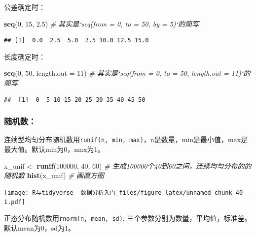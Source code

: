 \documentclass[]{book}
\newenvironment{Shaded}{\begin{snugshade}}{\end{snugshade}}
\newcommand{\CommentTok}[1]{\textcolor[rgb]{0.56,0.35,0.01}{\textit{#1}}}
\newcommand{\DataTypeTok}[1]{\textcolor[rgb]{0.13,0.29,0.53}{#1}}
\newcommand{\DecValTok}[1]{\textcolor[rgb]{0.00,0.00,0.81}{#1}}
\newcommand{\FloatTok}[1]{\textcolor[rgb]{0.00,0.00,0.81}{#1}}
\newcommand{\KeywordTok}[1]{\textcolor[rgb]{0.13,0.29,0.53}{\textbf{#1}}}
\newcommand{\NormalTok}[1]{#1}
\newcommand{\StringTok}[1]{\textcolor[rgb]{0.31,0.60,0.02}{#1}}
\begin{document}
公差确定时：

\begin{Shaded}
\begin{Highlighting}[]
\KeywordTok{seq}\NormalTok{(}\DecValTok{0}\NormalTok{, }\DecValTok{15}\NormalTok{, }\FloatTok{2.5}\NormalTok{) }\CommentTok{# 其实是`seq(from = 0, to = 50, by = 5)`的简写}
\end{Highlighting}
\end{Shaded}

\begin{verbatim}
## [1]  0.0  2.5  5.0  7.5 10.0 12.5 15.0
\end{verbatim}

长度确定时：

\begin{Shaded}
\begin{Highlighting}[]
 \KeywordTok{seq}\NormalTok{(}\DecValTok{0}\NormalTok{, }\DecValTok{50}\NormalTok{, }\DataTypeTok{length.out =} \DecValTok{11}\NormalTok{) }\CommentTok{# 其实是`seq(from = 0, to = 50, length.out = 11)`的简写}
\end{Highlighting}
\end{Shaded}

\begin{verbatim}
##  [1]  0  5 10 15 20 25 30 35 40 45 50
\end{verbatim}

\subsubsection{随机数：}

连续型均匀分布随机数用\texttt{runif(n,\ min,\ max)}，n是数量，min是最小值，max是最大值。默认min为0，max为1。

\begin{Shaded}
\begin{Highlighting}[]
\NormalTok{x_unif <-}\StringTok{ }\KeywordTok{runif}\NormalTok{(}\DecValTok{100000}\NormalTok{, }\DecValTok{40}\NormalTok{, }\DecValTok{60}\NormalTok{) }\CommentTok{# 生成100000个40到60之间，连续均匀分布的的随机数}
\KeywordTok{hist}\NormalTok{(x_unif) }\CommentTok{# 画直方图}
\end{Highlighting}
\end{Shaded}

\texttt{[image: R与tidyverse——数据分析入门\_files/figure-latex/unnamed-chunk-40-1.pdf]}

正态分布随机数用\texttt{rnorm(n,\ mean,\ sd)}, 三个参数分别为数量，平均值，标准差。默认mean为0，sd为1。
\end{document}
